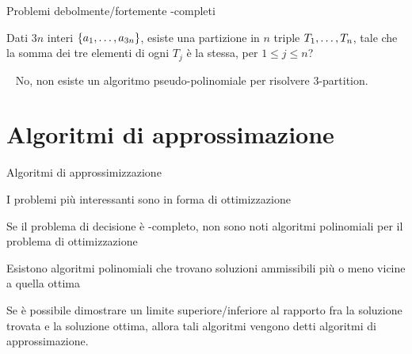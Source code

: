 \begin{frame}{Problemi debolmente/fortemente \NP-completi}

\vspace{-9pt}
\begin{myboxtitle}
Dati $3n$ interi $\{a_1, \ldots, a_{3n}\}$, esiste una partizione in $n$
triple $T_1, \ldots, T_n$, tale che la somma dei tre elementi di ogni $T_j$ è
la stessa, per $1 \le j \le n$?
\end{myboxtitle}

\begin{myboxtitle}
\begin{overprint}
~
No, non esiste un algoritmo pseudo-polinomiale per risolvere 3-partition.
\end{overprint}
\end{myboxtitle}

\end{frame}

\section{Algoritmi di approssimazione}

\begin{frame}{Algoritmi di approssimizzazione}

\vspace{-9pt}
\begin{myboxtitle}[Premessa]
\BIL
\item I problemi più interessanti sono in forma di ottimizzazione
\item Se il problema di decisione è \NP-completo, non sono noti 
algoritmi polinomiali per il problema di ottimizzazione
\item Esistono algoritmi polinomiali che trovano soluzioni ammissibili
più o meno vicine a quella ottima
\EIL
\end{myboxtitle}

\begin{myboxtitle}
Se è possibile dimostrare un limite superiore/inferiore al rapporto fra la soluzione trovata e la soluzione ottima, allora tali algoritmi
vengono detti \alert{algoritmi di approssimazione}.
\end{myboxtitle}

\end{frame}


